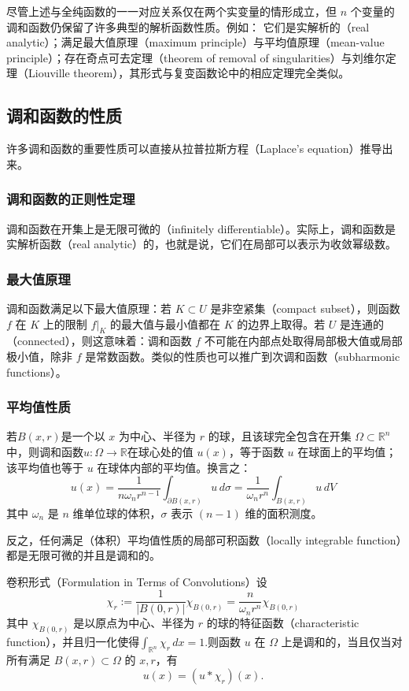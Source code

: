 尽管上述与全纯函数的一一对应关系仅在两个实变量的情形成立，但 \( n \) 个变量的调和函数仍保留了许多典型的解析函数性质。例如：  它们是实解析的（real analytic）；满足最大值原理（maximum principle）与平均值原理（mean-value principle）；存在奇点可去定理（theorem of removal of singularities）与刘维尔定理（Liouville theorem），其形式与复变函数论中的相应定理完全类似。
\subsection{调和函数的性质}
许多调和函数的重要性质可以直接从拉普拉斯方程（Laplace's equation）推导出来。
\subsubsection{调和函数的正则性定理}
调和函数在开集上是无限可微的（infinitely differentiable）。实际上，调和函数是实解析函数（real analytic）的，也就是说，它们在局部可以表示为收敛幂级数。
\subsubsection{最大值原理}
调和函数满足以下最大值原理：若 \( K \subset U \) 是非空紧集（compact subset），则函数 \( f \) 在 \( K \) 上的限制 \( f|_{K} \) 的最大值与最小值都在 \( K \) 的边界上取得。若 \( U \) 是连通的（connected），则这意味着：调和函数 \( f \) 不可能在内部点处取得局部极大值或局部极小值，除非 \( f \) 是常数函数。类似的性质也可以推广到次调和函数（subharmonic functions）。
\subsubsection{平均值性质}
若\( B(x, r) \)是一个以 \( x \) 为中心、半径为 \( r \) 的球，且该球完全包含在开集 \(\Omega \subset \mathbb{R}^n\) 中，则调和函数\(u:\Omega \to \mathbb{R}\)在球心处的值 \(u(x)\)，等于函数 \(u\) 在球面上的平均值；该平均值也等于 \(u\) 在球体内部的平均值。换言之：
\[
u(x)
=
\frac{1}{n\omega_n r^{n-1}}
\int_{\partial B(x,r)} u\,d\sigma
=
\frac{1}{\omega_n r^n}
\int_{B(x,r)} u\,dV~
\]
其中 \(\omega_n\) 是 \(n\) 维单位球的体积，\(\sigma\) 表示 \((n-1)\) 维的面积测度。

反之，任何满足（体积）平均值性质的局部可积函数（locally integrable function）都是无限可微的并且是调和的。

卷积形式（Formulation in Terms of Convolutions）设
\[
\chi_r := 
\frac{1}{|B(0,r)|}\chi_{B(0,r)}
=
\frac{n}{\omega_n r^n}\chi_{B(0,r)}~
\]
其中 \(\chi_{B(0,r)}\) 是以原点为中心、半径为 \(r\) 的球的特征函数（characteristic function），并且归一化使得\(\int_{\mathbb{R}^n}\chi_r\,dx = 1\).则函数 \(u\) 在 \(\Omega\) 上是调和的，当且仅当对所有满足 \(B(x,r) \subset \Omega\) 的 \(x, r\)，有
\[
u(x) = (u * \chi_r)(x).~
\]

